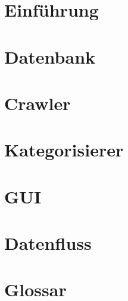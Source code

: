 

	\maketitle
	\setcounter{tocdepth}{1}
	\tableofcontents

	\chapter{Einführung}
			
	\chapter{Datenbank}
	\label{chap:datenbank}
		
	\chapter{Crawler}
	\label{chap:crawler}
		
	\chapter{Kategorisierer}
	\label{chap:kategorisierer}
		
	\chapter{GUI}
	\label{chap:gui}
		
	\chapter{Datenfluss}
	\label{chap:datenfluss}
		
	\chapter{Glossar}
		
	\listoffigures

